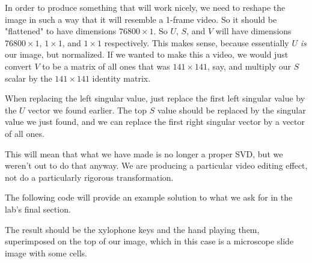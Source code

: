 In order to produce something that will work nicely, we need to reshape the image in such a way that it will resemble a 1-frame video. So it should be "flattened" to have dimensions $76800 \times 1$. So $U$, $S$, and $V$ will have dimensions $76800 \times 1$, $1 \times 1$, and $1 \times 1$ respectively. This makes sense, because essentially $U$ \textit{is} our image, but normalized. If we wanted to make this a video, we would just convert $V$ to be a matrix of all ones that was $141 \times 141$, say, and multiply our $S$ scalar by the $141 \times 141$ identity matrix.

When replacing the left singular value, just replace the first left singular value by the $U$ vector we found earlier. The top $S$ value should be replaced by the singular value we just found, and we can replace the first right singular vector by a vector of all ones.

This will mean that what we have made is no longer a proper SVD, but we weren't out to do that anyway. We are producing a particular video editing effect, not do a particularly rigorous transformation.

The following code will provide an example solution to what we ask for in the lab's final section.


The result should be the xylophone keys and the hand playing them, superimposed on the top of our image, which in this case is a microscope slide image with some cells.